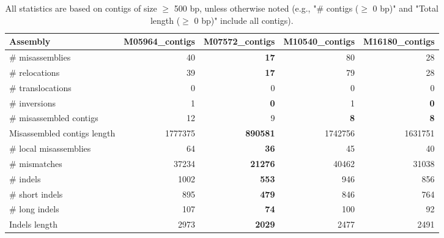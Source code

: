 \documentclass[12pt,a4paper]{article}
\begin{document}
\begin{table}[ht]
\begin{center}
\caption{All statistics are based on contigs of size $\geq$ 500 bp, unless otherwise noted (e.g., "\# contigs ($\geq$ 0 bp)" and "Total length ($\geq$ 0 bp)" include all contigs).}
\begin{tabular}{|l*{4}{|r}|}
\hline
Assembly & M05964\_contigs & M07572\_contigs & M10540\_contigs & M16180\_contigs \\ \hline
\# misassemblies & 40 & {\bf 17} & 80 & 28 \\ \hline
\hspace{5mm}\# relocations & 39 & {\bf 17} & 79 & 28 \\ \hline
\hspace{5mm}\# translocations & 0 & 0 & 0 & 0 \\ \hline
\hspace{5mm}\# inversions & 1 & {\bf 0} & 1 & {\bf 0} \\ \hline
\# misassembled contigs & 12 & 9 & {\bf 8} & {\bf 8} \\ \hline
Misassembled contigs length & 1777375 & {\bf 890581} & 1742756 & 1631751 \\ \hline
\# local misassemblies & 64 & {\bf 36} & 45 & 40 \\ \hline
\# mismatches & 37234 & {\bf 21276} & 40462 & 31038 \\ \hline
\# indels & 1002 & {\bf 553} & 946 & 856 \\ \hline
\hspace{5mm}\# short indels & 895 & {\bf 479} & 846 & 764 \\ \hline
\hspace{5mm}\# long indels & 107 & {\bf 74} & 100 & 92 \\ \hline
Indels length & 2973 & {\bf 2029} & 2477 & 2491 \\ \hline
\end{tabular}
\end{center}
\end{table}
\end{document}
